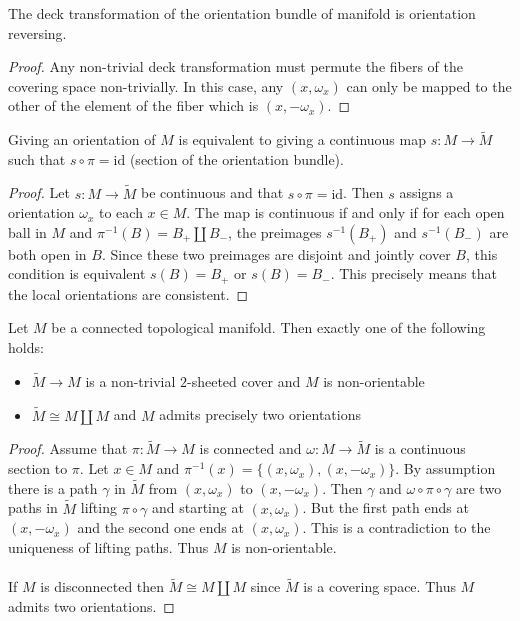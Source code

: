 \documentclass[a4paper]{article}
\begin{document}
\begin{lmm}{}{} The deck transformation of the orientation bundle of manifold is orientation reversing. \tcbline
\begin{proof}
Any non-trivial deck transformation must permute the fibers of the covering space non-trivially. In this case, any $(x,\omega_x)$ can only be mapped to the other of the element of the fiber which is $(x,-\omega_x)$. 
\end{proof}
\end{lmm}

\begin{lmm}{}{} Giving an orientation of $M$ is equivalent to giving a continuous map $s:M\to\widetilde{M}$ such that $s\circ\pi=\text{id}$ (section of the orientation bundle). \tcbline
\begin{proof}
Let $s:M\to\widetilde{M}$ be continuous and that $s\circ\pi=\text{id}$. Then $s$ assigns a orientation $\omega_x$ to each $x\in M$. The map is continuous if and only if for each open ball in $M$ and $\pi^{-1}(B)=B_+\amalg B_-$, the preimages $s^{-1}(B_+)$ and $s^{-1}(B_-)$ are both open in $B$. Since these two preimages are disjoint and jointly cover $B$, this condition is equivalent $s(B)=B_+$ or $s(B)=B_-$. This precisely means that the local orientations are consistent. 
\end{proof}
\end{lmm}

\begin{thm}{}{} Let $M$ be a connected topological manifold. Then exactly one of the following holds: 
\begin{itemize}
\item $\widetilde{M}\to M$ is a non-trivial $2$-sheeted cover and $M$ is non-orientable
\item $\widetilde{M}\cong M\amalg M$ and $M$ admits precisely two orientations
\end{itemize} \tcbline
\begin{proof}
Assume that $\pi:\widetilde{M}\to M$ is connected and $\omega:M\to\widetilde{M}$ is a continuous section to $\pi$. Let $x\in M$ and $\pi^{-1}(x)=\{(x,\omega_x),(x,-\omega_x)\}$. By assumption there is a path $\gamma$ in $\widetilde{M}$ from $(x,\omega_x)$ to $(x,-\omega_x)$. Then $\gamma$ and $\omega\circ\pi\circ\gamma$ are two paths in $\widetilde{M}$ lifting $\pi\circ\gamma$ and starting at $(x,\omega_x)$. But the first path ends at $(x,-\omega_x)$ and the second one ends at $(x,\omega_x)$. This is a contradiction to the uniqueness of lifting paths. Thus $M$ is non-orientable. \\~\\

If $M$ is disconnected then $\widetilde{M}\cong M\amalg M$ since $\widetilde{M}$ is a covering space. Thus $M$ admits two orientations. 
\end{proof}
\end{thm}
\end{document}
